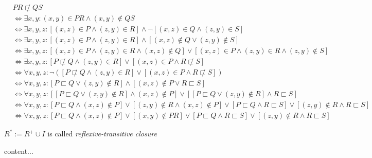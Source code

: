 \begin{align*}
&PR \not\sqsubset QS
\\&\Leftrightarrow
\exists x,y : (x,y) \in PR \wedge (x,y) \not\in QS
\\&\Leftrightarrow
\exists x,y,z: [(x,z) \in P \wedge (z,y) \in R] \wedge \neg[(x,z) \in Q \wedge (z,y) \in S]
\\&\Leftrightarrow
\exists x,y,z: [(x,z) \in P \wedge (z,y) \in R] \wedge [(x,z) \not\in Q \vee (z,y) \not\in S]
\\&\Leftrightarrow
\exists x,y,z:
[(x,z) \in P \wedge (z,y) \in R \wedge (x,z) \not\in Q]
\vee
[(x,z) \in P \wedge (z,y) \in R \wedge (z,y) \not\in S]
\\&\Leftrightarrow
\exists x,y,z:
[P \not\sqsubset Q \wedge (z,y) \in R]
\vee
[(x,z) \in P \wedge R \not\sqsubset S]
\\&\Leftrightarrow
\forall x,y,z:
\neg([P \not\sqsubset Q \wedge (z,y) \in R]
\vee
[(x,z) \in P \wedge R \not\sqsubset S])
\\&\Leftrightarrow
\forall x,y,z:
[P \sqsubset Q \vee (z,y) \not\in R]
\wedge
[(x,z) \not\in P \vee R \sqsubset S]
\\&\Leftrightarrow
\forall x,y,z:
[[P \sqsubset Q \vee (z,y) \not\in R] \wedge (x,z) \not\in P ]
\vee
[[P \sqsubset Q \vee (z,y) \not\in R] \wedge R \sqsubset S]
\\&\Leftrightarrow
\forall x,y,z:
[P \sqsubset Q \wedge (x,z) \not\in P] 
\vee 
[(z,y) \not\in R \wedge (x,z) \not\in P]
\vee
[P \sqsubset Q \wedge R \sqsubset S]
\vee 
[(z,y) \not\in R \wedge R \sqsubset S]
\\&\Leftrightarrow
\forall x,y,z:
[P \sqsubset Q \wedge (x,z) \not\in P] 
\vee 
[(x,y) \not\in PR]
\vee
[P \sqsubset Q \wedge R \sqsubset S]
\vee 
[(z,y) \not\in R \wedge R \sqsubset S]
\end{align*}



\begin{definition}
$R^{*} := R^{+} \cup I$
is called \textit{reflexive-transitive closure}
\end{definition}

\begin{definition}
content...
\end{definition}